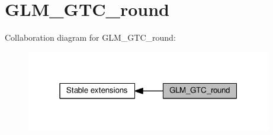 \hypertarget{group__gtc__round}{}\section{G\+L\+M\+\_\+\+G\+T\+C\+\_\+round}
\label{group__gtc__round}
Collaboration diagram for G\+L\+M\+\_\+\+G\+T\+C\+\_\+round\+:
\nopagebreak
\begin{figure}[H]
\begin{center}
\leavevmode
\includegraphics[width=304pt]{dd/d3b/group__gtc__round}
\end{center}
\end{figure}
